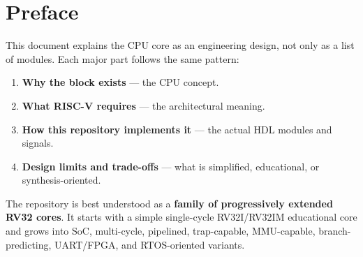 \section*{Preface}

This document explains the CPU core as an engineering design, not only as a list of modules. Each major part follows the same pattern:

\begin{enumerate}
\item \textbf{Why the block exists} — the CPU concept.
\item \textbf{What RISC-V requires} — the architectural meaning.
\item \textbf{How this repository implements it} — the actual HDL modules and signals.
\item \textbf{Design limits and trade-offs} — what is simplified, educational, or synthesis-oriented.
\end{enumerate}

The repository is best understood as a \textbf{family of progressively extended RV32 cores}. It starts with a simple single-cycle RV32I/RV32IM educational core and grows into SoC, multi-cycle, pipelined, trap-capable, MMU-capable, branch-predicting, UART/FPGA, and RTOS-oriented variants.

\bigskip
